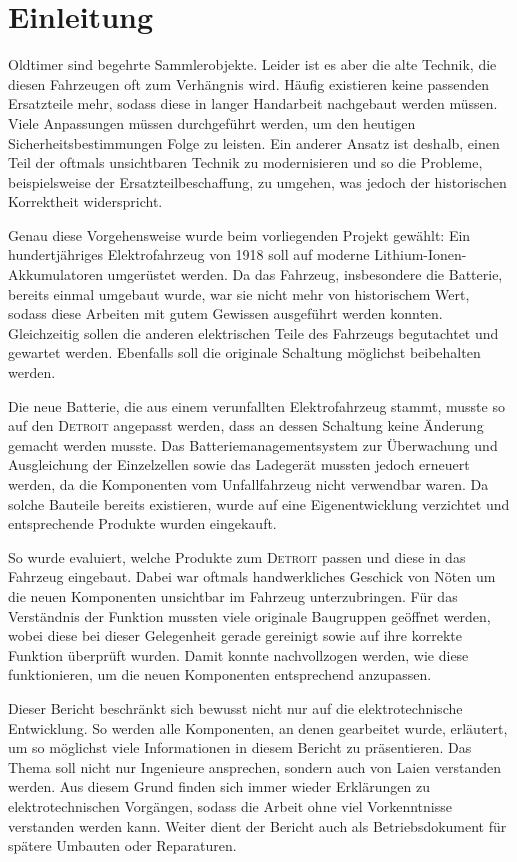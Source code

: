 \chapter{Einleitung}

Oldtimer sind begehrte Sammlerobjekte. Leider ist es aber die alte Technik, die diesen Fahrzeugen oft zum Verhängnis wird. Häufig existieren keine passenden Ersatzteile mehr, sodass diese in langer Handarbeit nachgebaut werden müssen. Viele Anpassungen müssen durchgeführt werden, um den heutigen Sicherheitsbestimmungen Folge zu leisten. Ein anderer Ansatz ist deshalb, einen Teil der oftmals unsichtbaren Technik zu modernisieren und so die Probleme, beispielsweise der Ersatzteilbeschaffung, zu umgehen, was jedoch der historischen Korrektheit widerspricht.

Genau diese Vorgehensweise wurde beim vorliegenden Projekt gewählt: Ein hundertjähriges Elektrofahrzeug von 1918 soll auf moderne Lithium-Ionen-Akkumulatoren umgerüstet werden. Da das Fahrzeug, insbesondere die Batterie, bereits einmal umgebaut wurde, war sie nicht mehr von historischem Wert, sodass diese Arbeiten mit gutem Gewissen ausgeführt werden konnten. Gleichzeitig sollen die anderen elektrischen Teile des Fahrzeugs begutachtet und gewartet werden. Ebenfalls soll die originale Schaltung möglichst beibehalten werden.

Die neue Batterie, die aus einem verunfallten Elektrofahrzeug stammt, musste so auf den \linebreak\textsc{Detroit} angepasst werden, dass an dessen Schaltung keine Änderung gemacht werden musste. Das Batteriemanagementsystem zur Überwachung und Ausgleichung der Einzelzellen sowie das Ladegerät mussten jedoch erneuert werden, da die Komponenten vom Unfallfahrzeug nicht verwendbar waren. Da solche Bauteile bereits existieren, wurde auf eine Eigenentwicklung verzichtet und entsprechende Produkte wurden eingekauft.

So wurde evaluiert, welche Produkte zum \textsc{Detroit} passen und diese in das Fahrzeug eingebaut. Dabei war oftmals handwerkliches Geschick von Nöten um die neuen Komponenten unsichtbar im Fahrzeug unterzubringen. Für das Verständnis der Funktion mussten
viele originale Baugruppen geöffnet werden, wobei diese bei dieser Gelegenheit gerade gereinigt sowie auf ihre korrekte Funktion überprüft wurden. Damit konnte nachvollzogen werden, wie diese funktionieren, um die neuen Komponenten entsprechend anzupassen.

Dieser Bericht beschränkt sich bewusst nicht nur auf die elektrotechnische Entwicklung. So werden alle Komponenten, an denen gearbeitet wurde, erläutert, um so möglichst viele Informationen in diesem Bericht zu präsentieren. Das Thema soll nicht nur Ingenieure ansprechen, sondern auch von Laien verstanden werden. Aus diesem Grund finden sich immer wieder Erklärungen zu elektrotechnischen Vorgängen, sodass die Arbeit ohne viel Vorkenntnisse verstanden werden kann. Weiter dient der Bericht auch als Betriebsdokument für spätere Umbauten oder Reparaturen.
